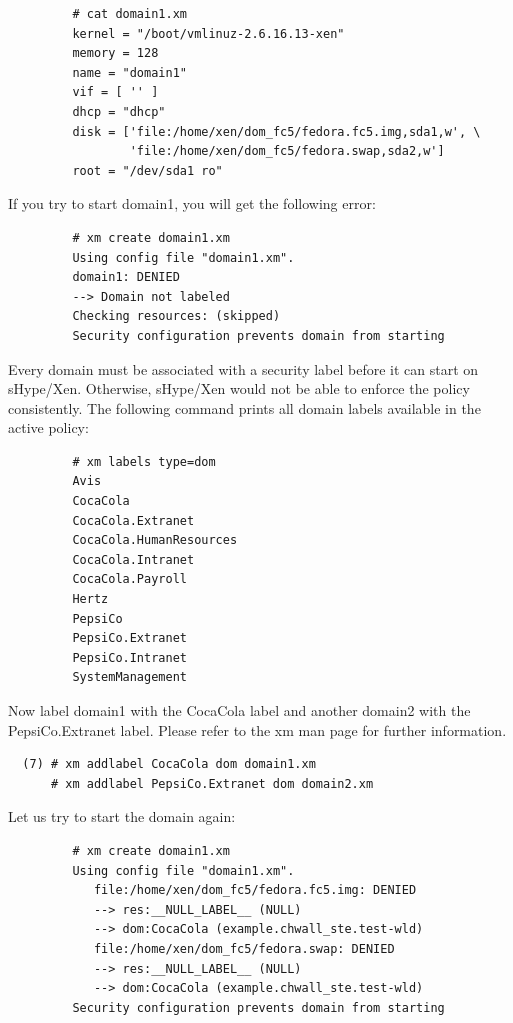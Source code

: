 \documentclass[11pt,twoside,final,openright]{report}
\begin{document}
\begin{scriptsize}
\begin{verbatim}
         # cat domain1.xm
         kernel = "/boot/vmlinuz-2.6.16.13-xen"
         memory = 128
         name = "domain1"
         vif = [ '' ]
         dhcp = "dhcp"
         disk = ['file:/home/xen/dom_fc5/fedora.fc5.img,sda1,w', \
                 'file:/home/xen/dom_fc5/fedora.swap,sda2,w']
         root = "/dev/sda1 ro"
\end{verbatim}
\end{scriptsize}

If you try to start domain1, you will get the following error:

\begin{scriptsize}
\begin{verbatim}
         # xm create domain1.xm
         Using config file "domain1.xm".
         domain1: DENIED
         --> Domain not labeled
         Checking resources: (skipped)
         Security configuration prevents domain from starting
\end{verbatim}
\end{scriptsize}

Every domain must be associated with a security label before it can
start on sHype/Xen. Otherwise, sHype/Xen would not be able to enforce
the policy consistently. The following command prints all domain
labels available in the active policy:

\begin{scriptsize}
\begin{verbatim}
         # xm labels type=dom
         Avis
         CocaCola
         CocaCola.Extranet
         CocaCola.HumanResources
         CocaCola.Intranet
         CocaCola.Payroll
         Hertz
         PepsiCo
         PepsiCo.Extranet
         PepsiCo.Intranet
         SystemManagement
\end{verbatim}
\end{scriptsize}

Now label domain1 with the CocaCola label and another domain2 with the
PepsiCo.Extranet label. Please refer to the xm man page for further
information.

\begin{verbatim}
  (7) # xm addlabel CocaCola dom domain1.xm
      # xm addlabel PepsiCo.Extranet dom domain2.xm
\end{verbatim}

Let us try to start the domain again:

\begin{scriptsize}
\begin{verbatim}
         # xm create domain1.xm
         Using config file "domain1.xm".
            file:/home/xen/dom_fc5/fedora.fc5.img: DENIED
            --> res:__NULL_LABEL__ (NULL)
            --> dom:CocaCola (example.chwall_ste.test-wld)
            file:/home/xen/dom_fc5/fedora.swap: DENIED
            --> res:__NULL_LABEL__ (NULL)
            --> dom:CocaCola (example.chwall_ste.test-wld)
         Security configuration prevents domain from starting
\end{verbatim}
\end{scriptsize}
\end{document}
